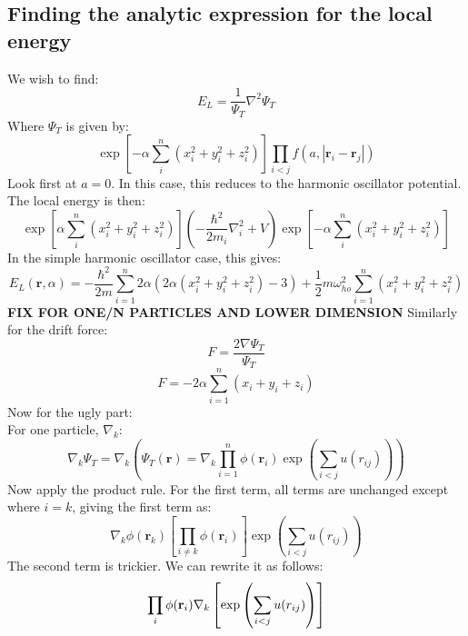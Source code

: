 \documentclass[a4paper, 10pt]{article}
\begin{document}
\begin{appendices}
\section{Finding the analytic expression for the local energy}
We wish to find:
\begin{equation}
E_L=\frac{1}{\Psi_T}\nabla^2 \Psi_T
\end{equation}
Where $\Psi_T$ is given by:
\begin{equation}
\exp\left[ -\alpha \sum_{i}^n\left(x_i^2+y_i^2+z_i^2\right)\right]\prod_{i<j}f(a, |\mathbf{r}_i-\mathbf{r}_j|)
\end{equation}
Look first at $a=0$. In this case, this reduces to the harmonic oscillator potential. The local energy is then:
\begin{equation}
\exp\left[ \alpha \sum_{i}^n\left(x_i^2+y_i^2+z_i^2\right)\right]\left(-\frac{\hbar^2}{2m_i}\nabla_i^2+V\right)\exp\left[ -\alpha \sum_{i}^n\left(x_i^2+y_i^2+z_i^2\right)\right]
\end{equation}
In the simple harmonic oscillator case, this gives:
\begin{equation}
E_L(\mathbf{r},\alpha)=-\frac{\hbar^2}{2m}\sum_{i=1}^n 2\alpha \left(2\alpha(x_i^2+y_i^2+z_i^2)-3\right)+\frac{1}{2}m\omega_{ho}^2\sum_{i=1}^n(x_i^2+y_i^2+z_i^2)
\end{equation}
\textbf{FIX FOR ONE/N PARTICLES AND LOWER DIMENSION}
Similarly for the drift force:
\begin{equation}
F=\frac{2\nabla \Psi_T}{\Psi_T}
\end{equation}
\begin{equation}
F=-2\alpha\sum_{i=1}^n(x_i+y_i+z_i)
\end{equation}
Now for the ugly part:\\
For one particle, $\nabla_k$:
\begin{equation}
\nabla_k\Psi_{T} = \nabla_k\left(\Psi_T(\mathbf{r})=\nabla_k \prod_{i=1}^n\phi(\mathbf{r}_i)\exp\left(\sum_{i<j} u(r_{ij})\right)\right)
\end{equation}
Now apply the product rule. For the first term, all terms are unchanged except where $i=k$, giving the first term as:
\begin{equation}
\nabla_k \phi(\mathbf{r}_k)\left[ \prod_{i\neq k} \phi(\mathbf{r}_i)\right]\exp\left(\sum_{i<j}u(r_{ij})\right)
\end{equation}
The second term is trickier. We can rewrite it as follows:
\begin{align}
  \prod_{i}\phi(\bold{r}_{i})\nabla_{k}\left[\exp\left(\sum_{i < j}u(r_{ij})\right)\right]

\end{align}
\end{appendices}
\end{document}
